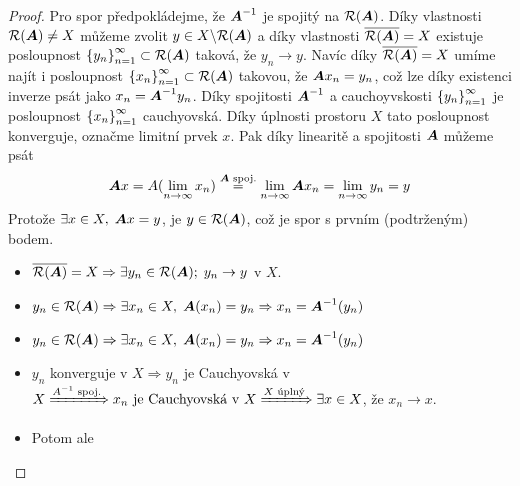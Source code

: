 \begin{proof}
    Pro spor předpokládejme, že $\boldsymbol{A}^{-1}$ je spojitý na $\mathcal{R}(\boldsymbol{A})$. Díky vlastnosti $\mathcal{R}(\boldsymbol{A}) \neq X$ můžeme zvolit $y\in X\backslash \mathcal{R}(\boldsymbol{A}) $ a díky vlastnosti $\overline{\mathcal{R}(\boldsymbol{A})}=X$ existuje posloupnost $\left \lbrace y_n \right \rbrace_{n=1}^\infty \subset \mathcal{R}(\boldsymbol{A})$ taková, že $y_n \rightarrow y$. Navíc díky $\overline{\mathcal{R}(\boldsymbol{A})}=X$ umíme najít i posloupnost $\left \lbrace x_n \right \rbrace_{n=1}^\infty \subset \mathcal{R}(\boldsymbol{A})$ takovou, že $\boldsymbol{A} x_n = y_n$, což lze díky existenci inverze psát jako $x_n = \boldsymbol{A}^{-1} y_n$. Díky spojitosti $\boldsymbol{A}^{-1}$ a cauchoyvskosti $\left \lbrace y_n \right \rbrace_{n=1}^\infty$ je posloupnost $\left \lbrace x_n \right \rbrace_{n=1}^\infty$ cauchyovská. Díky úplnosti prostoru $X$ tato posloupnost konverguje, označme limitní prvek $x$. Pak díky linearitě a spojitosti $\boldsymbol{A}$ můžeme psát \begin{align*}
        \boldsymbol{A}x=A(\lim\limits_{n\rightarrow \infty} x_n)\overset{\boldsymbol{A} \text{ spoj.}}{=} \lim\limits_{n\rightarrow \infty} \boldsymbol{A} x_n = \lim\limits_{n\rightarrow \infty} y_n= y
    \end{align*}
    Protože $\exists x\in X,\; \boldsymbol{A}x=y$, je $y\in\mathcal{R}(\boldsymbol{A})$, což je spor s prvním (podtrženým) bodem.
    
    \begin{itemize}
        \item $\overline{\mathcal{R}(\boldsymbol{A})}=X \Rightarrow \exists y_n\in\mathcal{R}(\boldsymbol{A});\; y_n\rightarrow y$ v $X$.
        \item $y_n\in\mathcal{R}(\boldsymbol{A}) \Rightarrow \exists x_n\in X, \;\boldsymbol{A}(x_n)=y_n \Rightarrow x_n=\boldsymbol{A}^{-1}(y_n)$
       \item $y_n\in\mathcal{R}(\boldsymbol{A})\Rightarrow \exists x_n\in X,\; \boldsymbol{A}(x_n)=y_n \Rightarrow x_n=\boldsymbol{A}^{-1}(y_n)$
        \item $y_n$ konverguje v $X \Rightarrow y_n$ je Cauchyovská v $X \xRightarrow{A^{-1} \text{ spoj.}} x_n \text{ je Cauchyovská v } X \xRightarrow{X \text{ úplný}} \exists x\in X$, že  $x_n\rightarrow x$.
        \item Potom ale
    \end{itemize}
\end{proof}

